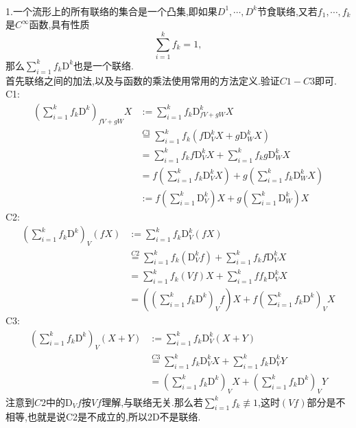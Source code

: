 \documentclass[a4paper]{ctexart}
\begin{document}
\pagestyle{plain}
\noindent
{}
\\
1.一个流形上的所有联络的集合是一个凸集,即如果$D^1,\cdots ,D^k$节食联络,又若$f_1,\cdots ,f_k$是$C^\infty$函数,具有性质
\[\sum_{i=1}^kf_k=1,\]
那么$\sum\limits_{i=1}^kf_k\mathrm{D}^k$也是一个联络.\\
首先联络之间的加法,以及与函数的乘法使用常用的方法定义.验证$C1-C3$即可.\\
C1:
\begin{align*}
\left( \sum_{i=1}^kf_k\mathrm{D}^k\right) _{fV+gW}X 
&:=\sum\limits_{i=1}^kf_k\mathrm{D}^k _{fV+gW}X\\
&\overset{C1}{=}\sum\limits_{i=1}^kf_k\left(f\mathrm{D}^k _{V}X+g\mathrm{D}^k _{W}X \right)\\
& =\sum_{i=1}^kf_kf\mathrm{D}^k _{V}X+\sum_{i=1}^kf_kg\mathrm{D}^k _{W}X\\
&=f\left( \sum_{i=1}^kf_k\mathrm{D}^k _{V}X\right) +g\left( \sum_{i=1}^kf_k\mathrm{D}^k _{W}X\right) \\
&:=f\left(  \sum_{i=1}^k\mathrm{D}_V^k\right)X + g\left( \sum_{i=1}^k\mathrm{D}_W^k\right)X
\end{align*}
C2:
\begin{align*}
\left( \sum_{i=1}^kf_k\mathrm{D}^k\right)_V(fX)&:= \sum_{i=1}^kf_k\mathrm{D}^k_V(fX)\\
&\overset{C2}{=}\sum_{i=1}^kf_k\left( \mathrm{D}^k_Vf\right)+\sum_{i=1}^kf_kf \mathrm{D}_V^kX\\
&=\sum_{i=1}^kf_k\left(Vf\right)X+\sum_{i=1}^kff_k \mathrm{D}_V^kX\\
&=\left( \left( \sum_{i=1}^kf_k\mathrm{D}^k\right)_Vf\right)X+f \left( \sum_{i=1}^kf_k\mathrm{D}^k\right)_VX 
\end{align*}
C3:
\begin{align*}
\left( \sum_{i=1}^kf_k\mathrm{D}^k\right) _V(X+Y)&:=\sum_{i=1}^kf_k\mathrm{D}^k_V(X+Y)\\
&\overset{C3}{=}\sum_{i=1}^kf_k\mathrm{D}^k_VX+\sum_{i=1}^kf_k\mathrm{D}^k_VY\\
&=\left( \sum_{i=1}^kf_k\mathrm{D}^k\right) _VX+\left( \sum_{i=1}^kf_k\mathrm{D}^k\right) _VY
\end{align*}
注意到$C2$中的$\mathrm{D}_Vf$按$Vf$理解,与联络无关.那么若$\sum_{i=1}^kf_k\not\equiv 1$,这时$(Vf)$部分是不相等,也就是说C2是不成立的,所以$2\mathrm{D}$不是联络.
\end{document}
